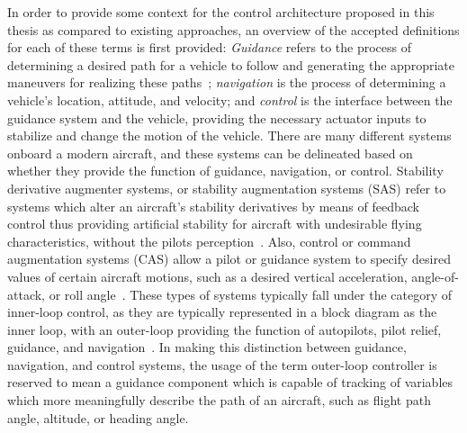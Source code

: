 In order to provide some context for the control architecture proposed in this thesis as compared to existing approaches, an overview of the accepted definitions for each of these terms is first provided: \textit{Guidance} refers to the process of determining a desired path for a vehicle to follow and generating the appropriate maneuvers for realizing these paths\ \cite{draper.apollo.1965}; \textit{navigation} is the process of determining a vehicle's location, attitude, and velocity; and \textit{control} is the interface between the guidance system and the vehicle, providing the necessary actuator inputs to stabilize and change the motion of the vehicle.
There are many different systems onboard a modern aircraft, and these systems can be delineated based on whether they provide the function of guidance, navigation, or control.
Stability derivative augmenter systems, or stability augmentation systems (SAS) refer to systems which alter an aircraft's stability derivatives by means of feedback control thus providing artificial stability for aircraft with undesirable flying characteristics, without the pilots perception\ \cite{abzug.stability.2005, mclean.flightcontrol.1990, nelson.flightcontrol.1998}.
Also, control or command augmentation systems (CAS) allow a pilot or guidance system to specify desired values of certain aircraft motions, such as a desired vertical acceleration, angle-of-attack, or roll angle\ \cite{onken.cognitiveautomation.2010}.
These types of systems typically fall under the category of inner-loop control, as they are typically represented in a block diagram as the inner loop, with an outer-loop providing the function of autopilots, pilot relief, guidance, and navigation\ \cite{yechout.flightmechanics.2003}.
In making this distinction between guidance, navigation, and control systems, the usage of the term outer-loop controller is reserved to mean a guidance component which is capable of tracking of variables which more meaningfully describe the path of an aircraft, such as flight path angle, altitude, or heading angle.

